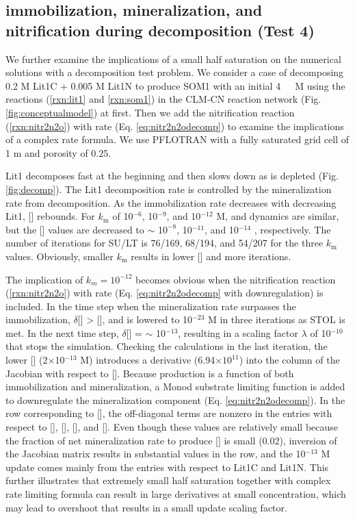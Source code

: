 \documentclass[gmd, manuscript]{copernicus}
\begin{document}
\subsection{ immobilization, mineralization, and nitrification during decomposition (Test 4)}
We further examine the implications of a small half saturation on the numerical
solutions with a decomposition test problem. We consider a case of decomposing
0.2 M Lit1C + 0.005 M Lit1N to produce SOM1 with an initial 4 \unit{\mu\,M} 
using the reactions (\ref{rxn:lit1} and \ref{rxn:som1}) in the CLM-CN
reaction network (Fig. \ref{fig:conceptualmodel}) at first. Then we add the
nitrification reaction (\ref{rxn:nitr2n2o}) with rate
(Eq. \ref{eq:nitr2n2odecomp}) to examine the implications of a complex
rate formula. We use PFLOTRAN with a fully saturated grid cell of 1 m and
porosity of 0.25. 

Lit1 decomposes fast at the beginning and then slows down as  is
depleted (Fig. \ref{fig:decomp}). The Lit1 decomposition rate is controlled by the
mineralization rate from  decomposition. As the immobilization rate
decreases with decreasing Lit1, [] rebounds. For $k_\text{m}$ of
10$^{-6}$, 10$^{-9}$, and 10$^{-12}$ M,  and  dynamics
are similar, but the [] values are decreased to $\sim$ 1$0^{-8}$,
10$^{-11}$, and 10$^{-14}$ , respectively. The number of iterations for
SU/LT is 76/169, 68/194, and 54/207 for the three $k_\text{m}$ values.
Obviously, smaller $k_\text{m}$ results in lower [] and more
iterations. 

The implication of $k_m=10^{-12}$ becomes obvious when the nitrification
reaction (\ref{rxn:nitr2n2o}) with rate (Eq.
\ref{eq:nitr2n2odecomp} with downregulation) is included. In the time step when the
mineralization rate surpasses the immobilization, $\delta$[] >
[], and  is lowered to 10$^{-23}$ \unit{M} in three
iterations as STOL is met. In the next time step, $\delta$[] =
$\sim$ 10$^{-13}$, resulting in a scaling factor $\lambda$ of 10$^{-10}$ that
stops the simulation. Checking the calculations in the last iteration, the
lower [] (2$\times$10$^{-13}$ \unit{M}) introduces a
derivative (6.94$\times 10^{11}$) into the column of the Jacobian with respect
to []. Because  production is a function of both
immobilization and mineralization, a Monod substrate limiting function is added
to downregulate the mineralization component (Eq.
\ref{eq:nitr2n2odecomp}). In the row corresponding to
[], the off-diagonal terms are nonzero in the entries with respect to
[], [],
[], and []. Even though these values are relatively small
because the fraction of net mineralization rate to produce [] is small (0.02),
inversion of the Jacobian matrix results in substantial values in the row, and
the 10$^{-13}$ \unit{M} update comes mainly from the entries with respect to
Lit1C and Lit1N. This further illustrates that
extremely small half saturation together with complex rate limiting formula can
result in large derivatives at small
concentration, which may lead to overshoot that results in a small update scaling
factor. 
\end{document}
